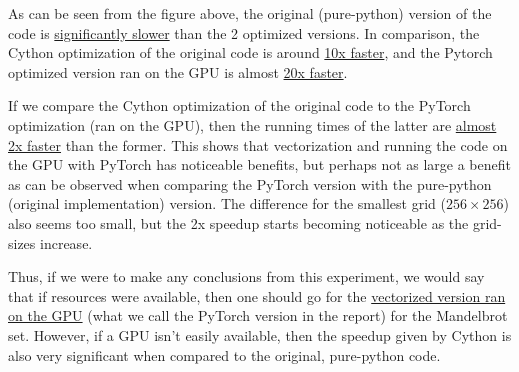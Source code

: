 \documentclass[a4paper,12pt]{article}
\begin{document}
As can be seen from the figure above, the original (pure-python) version of the code is \underline{significantly slower} than the 2 optimized versions. In comparison, the Cython optimization of the original code is around \underline{10x faster}, and the Pytorch optimized version ran on the GPU is almost \underline{20x faster}. 

If we compare the Cython optimization of the original code to the PyTorch optimization (ran on the GPU), then the running times of the latter are \underline{almost 2x faster} than the former. This shows that vectorization and running the code on the GPU with PyTorch has noticeable benefits, but perhaps not as large a benefit as can be observed when comparing the PyTorch version with the pure-python (original implementation) version. The difference for the smallest grid ($256 \times 256$) also seems too small, but the 2x speedup starts becoming noticeable as the grid-sizes increase. 

Thus, if we were to make any conclusions from this experiment, we would say that if resources were available, then one should go for the \underline{vectorized version ran on the GPU} (what we call the PyTorch version in the report) for the Mandelbrot set. However, if a GPU isn't easily available, then the speedup given by Cython is also very significant when compared to the original, pure-python code. 



\end{document}
